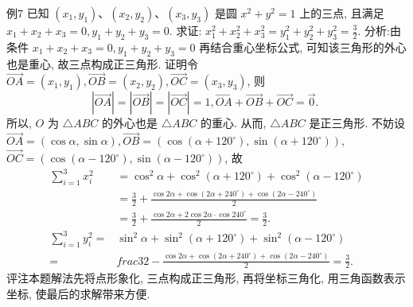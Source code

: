 例7 已知 $\left(x_1, y_1\right) 、\left(x_2, y_2\right) 、\left(x_3, y_3\right)$ 是圆 $x^2+y^2=1$ 上的三点, 且满足 $x_1+x_2+x_3=0, y_1+y_2+y_3=0$.
求证: $x_1^2+x_2^2+x_3^2=y_1^2+y_2^2+y_3^2=\frac{3}{2}$.
分析:由条件 $x_1+x_2+x_3=0, y_1+y_2+y_3=0$ 再结合重心坐标公式, 可知该三角形的外心也是重心, 故三点构成正三角形.
证明令 $\overrightarrow{O A}=\left(x_1, y_1\right), \overrightarrow{O B}=\left(x_2, y_2\right), \overrightarrow{O C}=\left(x_3, y_3\right)$, 则
$$
|\overrightarrow{O A}|=|\overrightarrow{O B}|=|\overrightarrow{O C}|=1, \overrightarrow{O A}+\overrightarrow{O B}+\overrightarrow{O C}=\overrightarrow{0} \text {. }
$$
所以, $O$ 为 $\triangle A B C$ 的外心也是 $\triangle A B C$ 的重心.
从而, $\triangle A B C$ 是正三角形.
不妨设 $\overrightarrow{O A}=(\cos \alpha, \sin \alpha), \overrightarrow{O B}=\left(\cos \left(\alpha+120^{\circ}\right), \sin \left(\alpha+120^{\circ}\right)\right)$, $\overrightarrow{O C}=\left(\cos \left(\alpha-120^{\circ}\right), \sin \left(\alpha-120^{\circ}\right)\right)$, 故
$$
\begin{aligned}
\sum_{i=1}^3 x_i^2 & =\cos ^2 \alpha+\cos ^2\left(\alpha+120^{\circ}\right)+\cos ^2\left(\alpha-120^{\circ}\right) \\
& =\frac{3}{2}+\frac{\cos 2 \alpha+\cos \left(2 \alpha+240^{\circ}\right)+\cos \left(2 \alpha-240^{\circ}\right)}{2} \\
& =\frac{3}{2}+\frac{\cos 2 \alpha+2 \cos 2 \alpha \cdot \cos 240^{\circ}}{2}=\frac{3}{2} . \\
\sum_{i=1}^3 y_i^2= & \sin ^2 \alpha+\sin ^2\left(\alpha+120^{\circ}\right)+\sin ^2\left(\alpha-120^{\circ}\right) \\
=\ &frac{3}{2}-\frac{\cos 2 \alpha+\cos \left(2 \alpha+240^{\circ}\right)+\cos \left(2 \alpha-240^{\circ}\right)}{2}=\frac{3}{2} .
\end{aligned}
$$
评注本题解法先将点形象化, 三点构成正三角形, 再将坐标三角化, 用三角函数表示坐标, 使最后的求解带来方便.



